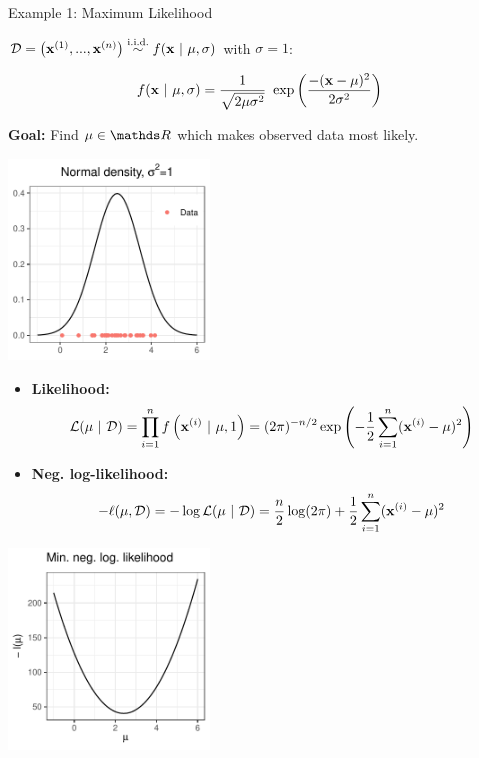 \documentclass[11pt,compress,t,notes=noshow, xcolor=table]{beamer}
\begin{document}
\begin{vbframe}{Example 1: Maximum Likelihood}

$\D = \left(\xi[1], ..., \xi[n]\right) \overset{\text{i.i.d.}}{\sim} f(\xv ~|~ \mu, \sigma)$ with $\sigma = 1$: 

$$
	f(\xv ~|~ \mu, \sigma) = \frac{1}{\sqrt{2 \mu \sigma^{2}}}~\exp\left(\frac{-(\xv-\mu)^{2}}{2\sigma^{2}}\right)
$$

\textbf{Goal:} Find $\mu \in \R$ which makes observed data most likely. 

\begin{center}
	\begin{footnotesize}
	\includegraphics[width=0.4\textwidth, keepaspectratio]{figure_man/ml_normal_example_dnorm.pdf} 
	\end{footnotesize}
\end{center}

\framebreak 

\begin{itemize}
	\item \textbf{Likelihood:} \vspace*{-0.4cm}
 $$\mathcal{L}(\mu~|~\D)= \prod_{i=1}^{n} f\left(\xi~|~\mu, 1\right) = (2\pi)^{-n/2}\exp\left(-\frac{1}{2} \sum_{i=1}^{n} (\xi-\mu)^{2} \right)$$
	\item \textbf{Neg. log-likelihood:} \vspace*{-0.4cm}
$$- \ell(\mu, \D) = - \log \mathcal{L}(\mu~|~\D) = \frac{n}{2} \log(2\pi) + \frac{1}{2} \sum_{i=1}^{n} (\xi-\mu)^{2}$$
\end{itemize}

\vspace*{-0.3cm}

\begin{center}
	\begin{footnotesize}
	\includegraphics[width=0.4\textwidth, keepaspectratio]{figure_man/ml_normal_example_negloglike_nooptim.pdf} 
	\end{footnotesize}
\end{center}
\framebreak 


\end{vbframe}
\end{document}
